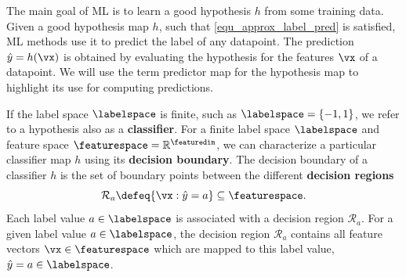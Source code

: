 \documentclass[12pt]{report}
\begin{document}
%

The main goal of ML is to learn a good hypothesis $h$ from some training data. 
Given a good hypothesis map $h$, such that \eqref{equ_approx_label_pred} 
is satisfied, ML methods use it to predict the label of any datapoint. 
The prediction $\hat{y}=h(\vx)$ is obtained by evaluating the hypothesis 
for the features $\vx$ of a datapoint. We will use the term predictor map 
for the hypothesis map to highlight its use for computing predictions. 

If the label space $\labelspace$ is finite, such as $\labelspace=\{-1,1\}$, 
we refer to a hypothesis also as a {\bf classifier}. For a finite label space 
$\labelspace$ and feature space $\featurespace=\mathbb{R}^{\featuredim}$, 
we can characterize a particular classifier map $h$ using its {\bf decision boundary}. 
The decision boundary of a classifier $h$ is the set of boundary points 
between the different {\bf decision regions}
\begin{equation} 
\label{equ_decision_region}
\mathcal{R}_{a} \defeq \{ \vx: \hat{y}= a \} \subseteq \featurespace. 
\end{equation}%
Each label value $a \in \labelspace$ is associated with a decision 
region $\mathcal{R}_{a}$. For a given label value $a \in \labelspace$, 
the decision region $\mathcal{R}_{a}$ contains all feature vectors 
$\vx \in \featurespace$ which are mapped to this label value, $\hat{y}=a \in \labelspace$. 

\end{document}
